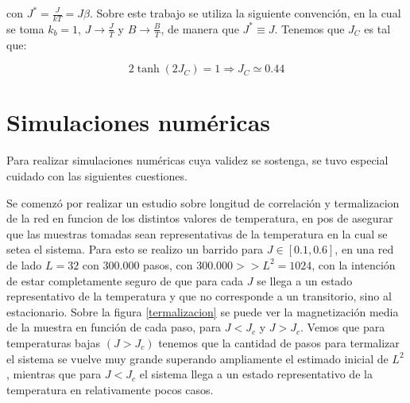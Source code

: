 \documentclass[%
 reprint,
 amsmath,amssymb,
 aps,
]{revtex4-1}
\begin{document}
con $J^* = \frac{J}{kT} = J\beta$. Sobre este trabajo se utiliza la siguiente
convenci\'on, en la cual se toma $k_b = 1$, $J \rightarrow \frac{J}{T}$ y $B
\rightarrow \frac{B}{T}$, de manera que $J^* \equiv J$. Tenemos que $J_C$ es tal
que:

\begin{equation}
  2 \tanh(2 J_C) = 1 \Rightarrow J_C \simeq 0.44
\end{equation}

\section{\label{simulations}Simulaciones num\'ericas}

Para realizar simulaciones num\'ericas cuya validez se sostenga, se tuvo
especial cuidado con las siguientes cuestiones.

Se comenz\'o por realizar un estudio sobre longitud de correlaci\'on y
termalizacion de la red en funcion de los distintos valores de temperatura, en
pos de asegurar que las muestras tomadas sean representativas de la temperatura
en la cual se setea el sistema. Para esto se realizo un barrido para $J \in
[0.1, 0.6]$, en una red de lado $L = 32$ con $300.000$ pasos,
con $300.000 >> L^2 = 1024$, con la intenci\'on de estar completamente seguro
de que para cada $J$ se llega a un estado representativo de la temperatura y
que no corresponde a un transitorio, sino al estacionario. Sobre la figura
\ref{termalizacion} se puede ver la magnetizaci\'on media de la muestra en
funci\'on de cada paso, para $J < J_c$ y $J > J_c$. Vemos que para temperaturas
bajas $(J > J_c)$ tenemos que la cantidad de pasos para termalizar el sistema
se vuelve muy grande superando ampliamente el estimado inicial de $L^2$,
mientras que para $J < J_c$ el sistema llega a un estado representativo de la
temperatura en relativamente pocos casos.
\end{document}
